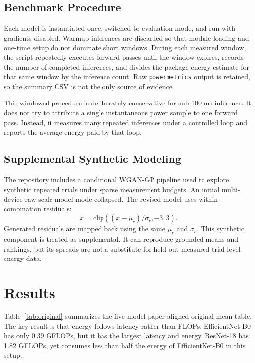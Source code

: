 \documentclass[conference]{IEEEtran}
\begin{document}
\subsection{Benchmark Procedure}

Each model is instantiated once, switched to evaluation mode, and run with
gradients disabled. Warmup inferences are discarded so that module loading and
one-time setup do not dominate short windows. During each measured window, the
script repeatedly executes forward passes until the window expires, records
the number of completed inferences, and divides the package-energy estimate
for that same window by the inference count. Raw \texttt{powermetrics} output
is retained, so the summary CSV is not the only source of evidence.

This windowed procedure is deliberately conservative for sub-100 ms inference.
It does not try to attribute a single instantaneous power sample to one
forward pass. Instead, it measures many repeated inferences under a controlled
loop and reports the average energy paid by that loop.

\subsection{Supplemental Synthetic Modeling}

The repository includes a conditional WGAN-GP pipeline used to explore
synthetic repeated trials under sparse measurement budgets. An initial
multi-device raw-scale model mode-collapsed. The revised model uses
within-combination residuals:
\begin{equation}
    \tilde{x} = \mathrm{clip}\left((x-\mu_c)/\sigma_c,-3,3\right).
\end{equation}
Generated residuals are mapped back using the same $\mu_c$ and $\sigma_c$.
This synthetic component is treated as supplemental. It can reproduce
grounded means and rankings, but its spreads are not a substitute for
held-out measured trial-level energy data.

\section{Results}

Table~\ref{tab:original} summarizes the five-model paper-aligned original mean
table. The key result is that energy follows latency rather than FLOPs.
EfficientNet-B0 has only 0.39 GFLOPs, but it has the largest latency and
energy. ResNet-18 has 1.82 GFLOPs, yet consumes less than half the energy of
EfficientNet-B0 in this setup.
\end{document}
